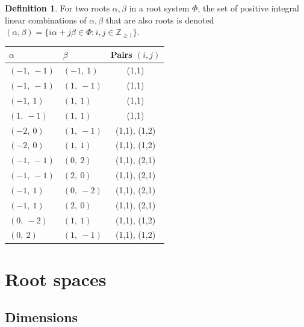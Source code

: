 \documentclass[11pt]{article}
\newcommand{\noi}{\noindent}
\theoremstyle{definition}
\newtheorem{definition}{Definition}[section]
\begin{document}
\begin{definition}
For two roots $\alpha, \beta$ in a root system $\Phi$, the set of positive integral linear combinations of $\alpha, \beta$ that are also roots is denoted
\(
	(\alpha, \beta) = \{ i \alpha + j \beta \in \Phi : i, j \in \mathbb{Z}_{\ge 1} \}
\).
\end{definition}
\noi \noindent \begin{longtable}{|l|l|c|}
    \hline
    $\alpha$ & $\beta$ & Pairs $(i,j)$ \\
    \hline
    \endhead
    $\left( -1, \  -1\right)$ & $\left( -1, \  1\right)$ & (1,1) \\
    \hline
    $\left( -1, \  -1\right)$ & $\left( 1, \  -1\right)$ & (1,1) \\
    \hline
    $\left( -1, \  1\right)$ & $\left( 1, \  1\right)$ & (1,1) \\
    \hline
    $\left( 1, \  -1\right)$ & $\left( 1, \  1\right)$ & (1,1) \\
    \hline
    $\left( -2, \  0\right)$ & $\left( 1, \  -1\right)$ & (1,1), (1,2) \\
    \hline
    $\left( -2, \  0\right)$ & $\left( 1, \  1\right)$ & (1,1), (1,2) \\
    \hline
    $\left( -1, \  -1\right)$ & $\left( 0, \  2\right)$ & (1,1), (2,1) \\
    \hline
    $\left( -1, \  -1\right)$ & $\left( 2, \  0\right)$ & (1,1), (2,1) \\
    \hline
    $\left( -1, \  1\right)$ & $\left( 0, \  -2\right)$ & (1,1), (2,1) \\
    \hline
    $\left( -1, \  1\right)$ & $\left( 2, \  0\right)$ & (1,1), (2,1) \\
    \hline
    $\left( 0, \  -2\right)$ & $\left( 1, \  1\right)$ & (1,1), (1,2) \\
    \hline
    $\left( 0, \  2\right)$ & $\left( 1, \  -1\right)$ & (1,1), (1,2) \\
    \hline
\end{longtable}

\fi

\newpage
\section{Root spaces}

\subsection{Dimensions}
\end{document}
